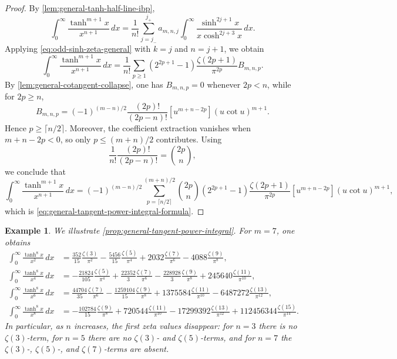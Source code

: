 \documentclass[11pt,twoside]{article}
\newtheorem{example}[theorem]{Example}
\numberwithin{equation}{section}
\begin{document}
\begin{proof} By \cref{lem:general-tanh-half-line-ibp}, \[ \int_0^\infty \frac{\tanh^{m+1}x}{x^{n+1}}\,dx = \frac1{n!} \sum_{j=j_-}^{j_+} a_{m,n,j} \int_0^\infty \frac{\sinh^{2j+1}x}{x\cosh^{2j+3}x}\,dx. \] Applying \eqref{eq:odd-sinh-zeta-general} with \(k=j\) and \(n=j+1\), we obtain \[ \int_0^\infty \frac{\tanh^{m+1}x}{x^{n+1}}\,dx = \frac1{n!} \sum_{p\geq1} (2^{2p+1}-1) \frac{\zeta(2p+1)}{\pi^{2p}} B_{m,n,p}. \] By \cref{lem:general-cotangent-collapse}, one has \(B_{m,n,p}=0\) whenever \(2p<n\), while for \(2p\geq n\), \[ B_{m,n,p} = (-1)^{(m-n)/2} \frac{(2p)!}{(2p-n)!} [u^{m+n-2p}](u\cot u)^{m+1}. \] Hence \(p\geq\lceil n/2\rceil\). Moreover, the coefficient extraction vanishes when \(m+n-2p<0\), so only \(p\leq(m+n)/2\) contributes. Using \[ \frac1{n!}\frac{(2p)!}{(2p-n)!} = \binom{2p}{n}, \] we conclude that \[ \int_0^\infty \frac{\tanh^{m+1}x}{x^{n+1}}\,dx = (-1)^{(m-n)/2} \sum_{p=\lceil n/2\rceil}^{(m+n)/2} \binom{2p}{n} (2^{2p+1}-1) \frac{\zeta(2p+1)}{\pi^{2p}} [u^{m+n-2p}](u\cot u)^{m+1}, \] which is \eqref{eq:general-tangent-power-integral-formula}. \end{proof}

\begin{example}
We illustrate \cref{prop:general-tangent-power-integral}. For \(m=7\), one obtains
\begin{align*}
\int_0^\infty \frac{\tanh^8 x}{x^2}\,dx
&=
\frac{352}{15}\frac{\zeta(3)}{\pi^2}
-\frac{5456}{15}\frac{\zeta(5)}{\pi^4}
+2032\frac{\zeta(7)}{\pi^6}
-4088\frac{\zeta(9)}{\pi^8},
\\
\int_0^\infty \frac{\tanh^8 x}{x^4}\,dx
&=
-\frac{21824}{105}\frac{\zeta(5)}{\pi^4}
+\frac{22352}{3}\frac{\zeta(7)}{\pi^6}
-\frac{228928}{3}\frac{\zeta(9)}{\pi^8}
+245640\frac{\zeta(11)}{\pi^{10}},
\\
\int_0^\infty \frac{\tanh^8 x}{x^6}\,dx
&=
\frac{44704}{35}\frac{\zeta(7)}{\pi^6}
-\frac{1259104}{15}\frac{\zeta(9)}{\pi^8}
+1375584\frac{\zeta(11)}{\pi^{10}}
-6487272\frac{\zeta(13)}{\pi^{12}},
\\
\int_0^\infty \frac{\tanh^8 x}{x^8}\,dx
&=
-\frac{102784}{15}\frac{\zeta(9)}{\pi^8}
+720544\frac{\zeta(11)}{\pi^{10}}
-17299392\frac{\zeta(13)}{\pi^{12}}
+112456344\frac{\zeta(15)}{\pi^{14}}.
\end{align*}
In particular, as \(n\) increases, the first zeta values disappear:
for \(n=3\) there is no \(\zeta(3)\)-term, for \(n=5\) there are no
\(\zeta(3)\)- and \(\zeta(5)\)-terms, and for \(n=7\) the
\(\zeta(3)\)-, \(\zeta(5)\)-, and \(\zeta(7)\)-terms are absent.
\end{example}
\end{document}
